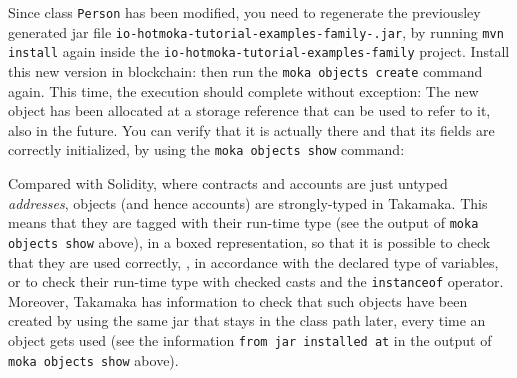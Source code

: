 Since class \texttt{Person} has been modified, you need to regenerate the previousley generated
jar file
\texttt{io-hotmoka-tutorial-examples-family-\hotmokaVersion{}.jar},
by running \texttt{mvn install} again
inside the \texttt{io-hotmoka-tutorial-examples-family} project.
Install this new version in blockchain:
%
%
then run the \texttt{moka objects create} command again. This time, the execution should
complete without exception:
%
%
The new object has been allocated at a storage reference \texttt{\personObjectShort{}}
that can be used to refer to it, also in the future.
You can verify that it is actually there and that its fields are correctly initialized,
by using the \texttt{moka objects show} command:
%
%
\begin{commentbox}
  Compared with Solidity, where contracts and accounts are just untyped \emph{addresses},
  objects (and hence accounts) are strongly-typed in Takamaka.
  This means that they are tagged with their run-time type (see the output
  of \texttt{moka objects show} above), in a boxed representation,
  so that it is possible to check that they are used correctly, \ie{}, in accordance
  with the declared type of variables, or to check their run-time type with checked casts
  and the \texttt{instanceof} operator. Moreover, Takamaka has information to check
  that such objects have been created by using the same
  jar that stays in the class path later, every time an object gets used
  (see the information \texttt{from jar installed at} in the output of
  \texttt{moka objects show} above).
\end{commentbox}

